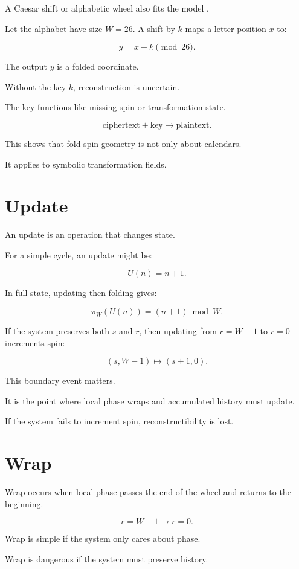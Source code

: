 \documentclass[11pt]{book}
\begin{document}
A Caesar shift or alphabetic wheel also fits the model \cite{Kahn1996Codebreakers,Singh1999CodeBook}.

Let the alphabet have size \(W=26\). A shift by \(k\) maps a letter position \(x\) to:

\[
y = x + k \pmod{26}.
\]

The output \(y\) is a folded coordinate.

Without the key \(k\), reconstruction is uncertain.

The key functions like missing spin or transformation state.

\[
\text{ciphertext} + \text{key} \rightarrow \text{plaintext}.
\]

This shows that fold-spin geometry is not only about calendars.

It applies to symbolic transformation fields.

\section{Update}

An update is an operation that changes state.

For a simple cycle, an update might be:

\[
U(n)=n+1.
\]

In full state, updating then folding gives:

\[
\pi_W(U(n)) = (n+1) \bmod W.
\]

If the system preserves both \(s\) and \(r\), then updating from \(r=W-1\) to \(r=0\) increments spin:

\[
(s,W-1) \mapsto (s+1,0).
\]

This boundary event matters.

It is the point where local phase wraps and accumulated history must update.

If the system fails to increment spin, reconstructibility is lost.

\section{Wrap}

Wrap occurs when local phase passes the end of the wheel and returns to the beginning.

\[
r = W-1 \rightarrow r = 0.
\]

Wrap is simple if the system only cares about phase.

Wrap is dangerous if the system must preserve history.
\end{document}
